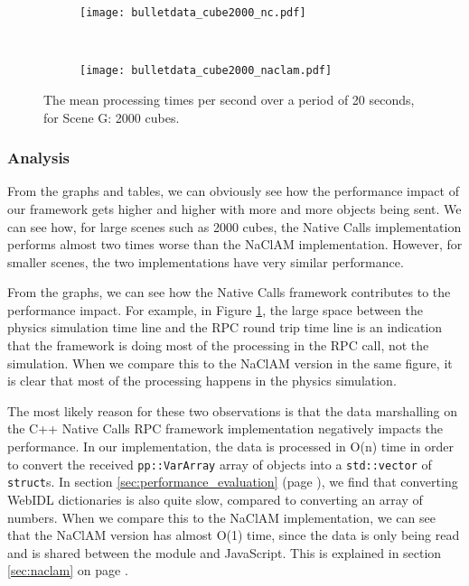 \begin{figure}
        \centering
        \begin{subfigure}[b]{\textwidth}
                \texttt{[image: bulletdata\_cube2000\_nc.pdf]}
        \end{subfigure}%
        \\
        \begin{subfigure}[b]{\textwidth}
                \texttt{[image: bulletdata\_cube2000\_naclam.pdf]}
        \end{subfigure}
        \caption{The mean processing times per second over a period of 20 seconds, for Scene G: 2000 cubes.}
        \label{fig:bullet_graph_cube2000}
\end{figure}


\subsubsection{Analysis} %
\label{ssub:bullet_physics_performanceanalysis}
From the graphs and tables, we can obviously see how the performance impact of our framework gets higher and higher with more and more objects being sent. We can see how, for large scenes such as 2000 cubes, the Native Calls implementation performs almost two times worse than the NaClAM implementation. However, for smaller scenes, the two implementations have very similar performance.

From the graphs, we can see how the Native Calls framework contributes to the performance impact. For example, in Figure \ref{fig:bullet_graph_cube2000}, the large space between the physics simulation time line and the RPC round trip time line is an indication that the framework is doing most of the processing in the RPC call, not the simulation. When we compare this to the NaClAM version in the same figure, it is clear that most of the processing happens in the physics simulation.

The most likely reason for these two observations is that the data marshalling on the C++ Native Calls RPC framework implementation negatively impacts the performance. In our implementation, the data is processed in O(n) time in order to convert the received \lstinline{pp::VarArray} array of objects into a \lstinline{std::vector} of \lstinline{struct}s. In section \ref{sec:performance_evaluation} (page \pageref{sec:performance_evaluation}), we find that converting WebIDL dictionaries is also quite slow, compared to converting an array of numbers. When we compare this to the NaClAM implementation, we can see that the NaClAM version has almost O(1) time, since the data is only being read and is shared between the module and JavaScript. This is explained in section \ref{sec:naclam} on page \pageref{sec:naclam}.

